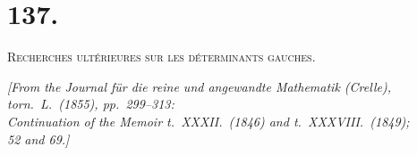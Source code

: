 \documentclass[12pt,a4paper]{article}
\begin{document}
\setcounter{page}{209}


\section*{137.}

\textsc{Recherches ult\'{e}rieures sur les d\'{e}terminants gauches.}

\begin{flushright}
\textit{[From the Journal f\"{u}r die reine und angewandte Mathematik (Crelle),}\\
\textit{torn.\ L.\ (1855), pp.\ 299--313:}\\
\textit{Continuation of the Memoir t.\ XXXII.\ (1846) and t.\ XXXVIII.\ (1849);}\\
\textit{52 and 69.]}
\end{flushright}
\end{document}
